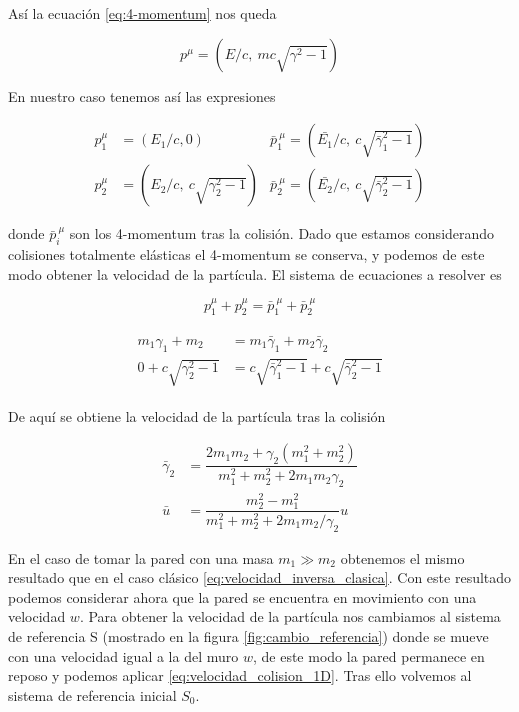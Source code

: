 \documentclass[11pt, spanish]{book}
\begin{document}
Así la ecuación \ref{eq:4-momentum} nos queda

\begin{equation}
    p^\mu = \left( E/c, \: mc\sqrt{\gamma^2 -1} \right)
\end{equation}

En nuestro caso tenemos así las expresiones

\begin{align}
    p^\mu_1 &= \left( E_1/c, 0 \right)  &\bar{p}^{\:\mu}_1 = \left( \bar{E_1}/c, \: c\sqrt{\bar{\gamma}^2_1 -1}  \right) \nonumber \\
    p^\mu_2 &= \left( E_2/c, \: c\sqrt{\gamma^2_2 -1} \right)   &\bar{p}^{\:\mu}_2 = \left( \bar{E_2}/c, \: c\sqrt{\bar{\gamma}^2_2 -1}  \right) \nonumber
\end{align}

donde \( \bar{p}^{\:\mu}_i \) son los 4-momentum tras la colisión. Dado que estamos considerando colisiones totalmente elásticas el 4-momentum se conserva, y podemos de este modo obtener la velocidad de la partícula. El sistema de ecuaciones a resolver es

\begin{equation}
    p^\mu_1 + p^\mu_2 = \bar{p}^{\:\mu}_1 + \bar{p}^{\:\mu}_2
\end{equation}

\begin{align}
        \begin{split}
            m_1\gamma_1 + m_2 &= m_1\bar{\gamma}_1 + m_2\bar{\gamma}_2 \\
        0 + c\sqrt{\gamma^2_2 -1} &= c\sqrt{\bar{\gamma}^2_1 -1} + c\sqrt{\bar{\gamma}^2_2 -1}
        \end{split}
\end{align}

De aquí se obtiene la velocidad de la partícula tras la colisión

\begin{align}\label{eq:velocidad_colision_1D}
    \bar{\gamma}_2 &= \dfrac{2 m_1 m_2 + \gamma_2(m_1^2 + m_2^2)}{m_1^2+m_2^2+2 m_1 m_2 \gamma_2} \\[3mm]
    \bar{u} &= \dfrac{m_2^2 - m_1^2}{m_1^2 + m_2^2 + 2 m_1 m_2 / \gamma_2}u
\end{align}

En el caso de tomar la pared con una masa \( m_1 \gg m_2 \) obtenemos el mismo resultado que en el caso clásico \ref{eq:velocidad_inversa_clasica}. Con este resultado podemos considerar ahora que la pared se encuentra en movimiento con una velocidad \( w \). Para obtener la velocidad de la partícula nos cambiamos al sistema de referencia S (mostrado en la figura \ref{fig:cambio_referencia}) donde se mueve con una velocidad igual a la del muro \( w \), de este modo la pared permanece en reposo y podemos aplicar \ref{eq:velocidad_colision_1D}. Tras ello volvemos al sistema de referencia inicial \( S_0 \).
\end{document}
